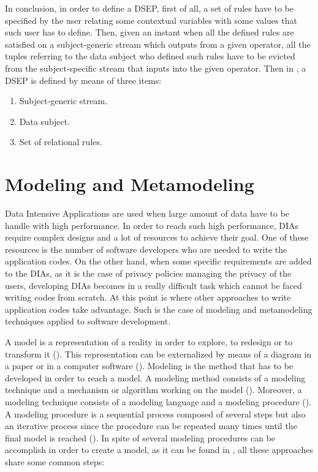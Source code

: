 In conclusion, in order to define a DSEP, first of all, a set of rules have to be specified by the user relating some contextual variables with some values that such user has to define. Then, given an instant when all the defined rules are satisfied on a subject-generic stream which outputs from a given operator, all the tuples referring to the data subject who defined such rules have to be evicted from the subject-specific stream that inputs into the given operator. Then in \cite{privacypoliciesarticle}, a DSEP is defined by means of three items:

\begin{enumerate}

\item Subject-generic stream.
\item Data subject.
\item Set of relational rules.

\end{enumerate}

\section{Modeling and Metamodeling}

\label{Modeling and Metamodeling}

Data Intensive Applications are used when large amount of data have to be handle with high performance. In order to reach such high performance, DIAs require complex designs and a lot of resources to achieve their goal. One of these resources is the number of software developers who are needed to write the application codes. On the other hand, when some specific requirements are added to the DIAs, as it is the case of privacy policies managing the privacy of the users, developing DIAs becomes in a really difficult task which cannot be faced writing codes from scratch. At this point is where other approaches to write application codes take advantage. Such is the case of modeling and metamodeling techniques applied to software development.

A model is a representation of a reality in order to explore, to redesign or to transform it (\cite{modelwebsite}). This representation can be externalized by means of a diagram in a paper or in a computer software (\cite{modelwebsite}). Modeling is the method that has to be developed in order to reach a model. A modeling method consists of a modeling technique and a mechanism or algorithm working on the model (\cite{modelwebsite}). Moreover, a modeling technique consists of a modeling language and a modeling procedure (\cite{metamodelwebsite}). A modeling procedure is a sequential process composed of several steps but also an iterative process since the procedure can be repeated many times until the final model is reached (\cite{modelwebsite}). In spite of several modeling procedures can be accomplish in order to create a model, as it can be found in \cite{modelwebsite}, all these approaches share some common steps:

